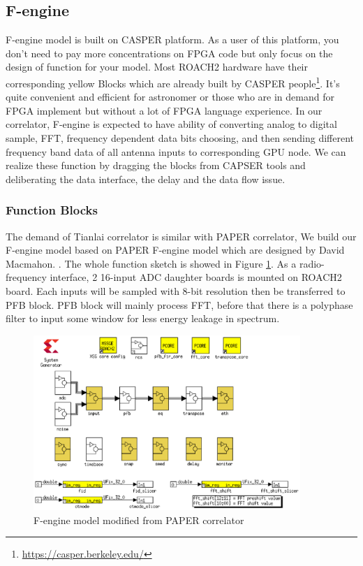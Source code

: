 \documentclass{ws-jai}
\begin{document}
\subsection{F-engine}\label{sec:F-engine}
	F-engine model is built on CASPER platform. As a user of this platform, you don't need to pay more concentrations on FPGA code but only focus on the design of function for your model. Most ROACH2 hardware have their corresponding yellow Blocks which are already built by CASPER people\footnote{\url{https://casper.berkeley.edu/}}. It's quite convenient and efficient for astronomer or those who are in demand for FPGA implement but without a lot of FPGA language experience. In our correlator, F-engine is expected  to have ability of  converting analog to digital sample, FFT, frequency dependent data bits choosing,  and then sending different frequency band data of all antenna inputs to corresponding GPU node. We can realize these function  by dragging the blocks from CAPSER tools and deliberating the data interface, the delay and the data flow issue.

\subsubsection{Function Blocks\label{sec:function model}}
	The demand of Tianlai correlator is similar with PAPER correlator, We build our F-engine model based on PAPER F-engine model which are designed by David Macmahon. \citep{paper_correlator}. The whole function sketch is showed in Figure \ref{fig:f-engine}. As a radio-frequency interface,  2 16-input ADC daughter boards is mounted on ROACH2 board.  Each inputs will be sampled with 8-bit resolution then be transferred to PFB block. PFB block will mainly process FFT, before that there is a polyphase filter to input some window for less energy leakage in spectrum.
	
\begin{figure}[t]
 \centering
 \includegraphics[width=0.9\textwidth]{./picture/f-engine1.eps}
\caption{F-engine model modified from PAPER correlator\label{fig:f-engine}}
\end{figure}
\end{document}
